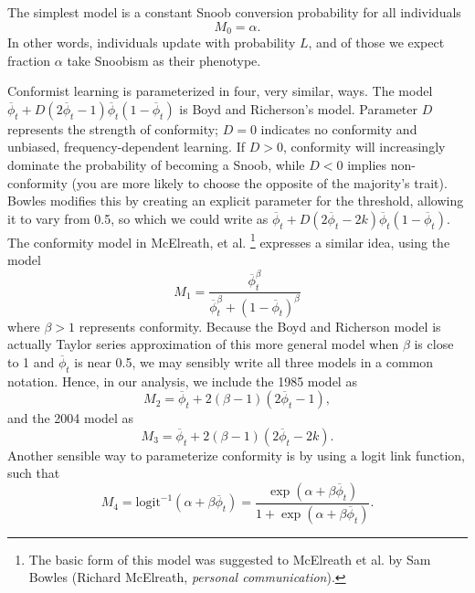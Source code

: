 \documentclass[11pt]{article}
\begin{document}
The simplest model is a constant Snoob conversion probability for all individuals
	\[M_0 = \alpha.
\]
In other words, individuals update with probability $L$, and of those we expect fraction $\alpha$ take Snoobism as their phenotype.

Conformist learning is parameterized in four, very similar, ways.  The model $\overline{\phi}_t + D(2\overline{\phi}_t-1) \overline{\phi}_t (1-\overline{\phi}_t)$ is Boyd and Richerson's \cite{boyd1985culture} model.  Parameter $D$ represents the strength of conformity; $D=0$ indicates no conformity and unbiased, frequency-dependent learning.  If $D > 0$, conformity will increasingly dominate the probability of becoming a Snoob, while $D < 0$ implies non-conformity (you are more likely to choose the opposite of the majority's trait).  Bowles \cite{bowles2006microeconomics} modifies this by creating an explicit parameter for the threshold, allowing it to vary from 0.5, so which we could write as $\overline{\phi}_t + D(2\overline{\phi}_t-2k)\overline{\phi}_t(1-\overline{\phi}_t)$.  The conformity model in McElreath, et al. \cite{mcelreath2008beyond}\footnote{The basic form of this model was suggested to McElreath et al. by Sam Bowles (Richard McElreath, \textit{personal communication}).} expresses a similar idea, using the model
	\[ M_1 = \frac{\overline{\phi}_t^\beta}{\overline{\phi}_t^\beta + (1-\overline{\phi}_t)^\beta}
\]
where $\beta > 1$ represents conformity.  Because the Boyd and Richerson model is actually Taylor series approximation of this more general model when $\beta$ is close to 1 and $\overline{\phi}_t$ is near 0.5, we may sensibly write all three models in a common notation.  Hence, in our analysis, we include the 1985 model as
	\[ M_2 = \overline{\phi}_t + 2(\beta-1)(2\overline{\phi}_t-1),
\]
and the 2004 model as
	\[ M_3 = \overline{\phi}_t + 2(\beta-1)(2\overline{\phi}_t-2k).
\]
Another sensible way to parameterize conformity is by using a logit link function, such that
	\[ M_4 = \mathrm{logit}^{-1}(\alpha + \beta \overline{\phi}_t) = \frac{\exp(\alpha + \beta \overline{\phi}_t)}{1 + \exp(\alpha + \beta \overline{\phi}_t)}. \]
\end{document}
